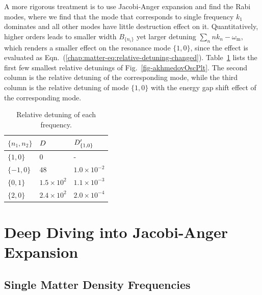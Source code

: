 A more rigorous treatment is to use Jacobi-Anger expansion and find the Rabi modes, where we find that the mode that corresponds to single frequency $k_1$ dominates and all other modes have little destruction effect on it. Quantitatively, higher orders leads to smaller width $B_{\{n_i\}}$ yet larger detuning $\sum_{n} nk_n-\omega_{\mathrm m}$, which renders a smaller effect on the resonance mode $\{1,0\}$, since the effect is evaluated as Eqn.~(\ref{chap:matter-eq:relative-detuning-changed}).
Table~\ref{tab-q-values-each-mode} lists the first few smallest relative detunings of Fig.~\ref{fig-akhmedovOscPlt}. The second column is the relative detuning of the corresponding mode, while the third column is the relative detuning of mode $\{1,0\}$ with the energy gap shift effect of the corresponding mode.




\begin{table}
\centering

\begin{tabular}{lll}
\hline
 $\{n_1,n_2\}$ &  $D$ & $D'_{\{1,0\}}$   \\
\hline
 $\{1,0\}$ & $0$ &  - \\
 $\{-1,0\}$ & $48$ &  $1.0\times 10^{-2}$ \\
 $\{0,1\}$ & $1.5\times 10^2$ &  $1.1\times 10^{-3}$  \\
 $\{2,0\}$ & $2.4\times 10^{2}$ & $2.0\times 10^{-4}$ \\
 \hline
\end{tabular}
\caption{\label{tab-q-values-each-mode}Relative detuning of each frequency.}
\end{table}


\section{\label{chap:matter-sec:deep-jacobi}Deep Diving into Jacobi-Anger Expansion}


\subsection{\label{chap:matter-sec:deep-jacobi-subsec:single-matter-freq}Single Matter Density Frequencies}


